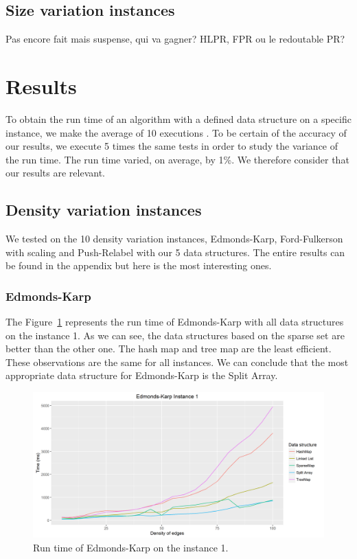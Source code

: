 \subsection{Size variation instances}
Pas encore fait mais suspense, qui va gagner? HLPR, FPR ou le redoutable PR?

\section{Results}
To obtain the run time of an algorithm with a defined data structure on a specific instance, we make the average of 10 executions	. To be certain of the accuracy of our results, we execute 5 times the same tests in order to study the variance of the run time. The run time varied, on average, by 1\%. We therefore consider that our results are relevant.

\subsection{Density variation instances}
We tested on the 10 density variation instances, Edmonds-Karp, Ford-Fulkerson with scaling and Push-Relabel with our 5 data structures. The entire results can be found in the appendix but here is the most interesting ones.

\subsubsection{Edmonds-Karp}
The Figure~\ref{fig:EK1} represents the run time of Edmonds-Karp with all data structures on the instance 1. As we can see, the data structures based on the sparse set are better than the other one. The hash map and tree map are the least efficient. These observations are the same for all instances. We can conclude that the most appropriate data structure for Edmonds-Karp is the Split Array.

\begin{figure}[H]
\includegraphics[scale=0.63]{images/EK1.png}
\caption{Run time of Edmonds-Karp on the instance 1.}
\label{fig:EK1}
\end{figure}

